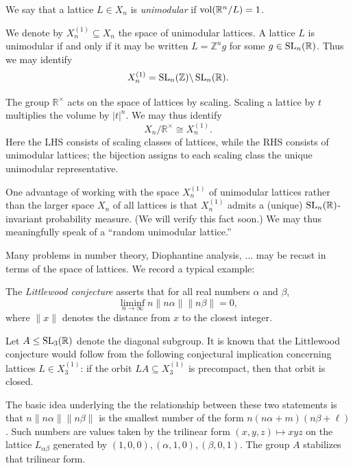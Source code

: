 \documentclass[reqno]{amsart} 
\begin{document}
\begin{definition}
  We say that a lattice $L \in X_n$ is \emph{unimodular} if $\operatorname{vol}(\mathbb{R}^n/L) = 1$.
\end{definition}
We denote by $X_n^{(1)} \subseteq X_n$ the space of unimodular lattices.  A lattice $L$ is unimodular if and only if it may be written $L = \mathbb{Z}^n g$ for some $g \in \operatorname{SL}_n(\mathbb{R})$.  Thus we may identify
\begin{equation*}
  X_n^{(1)} = \operatorname{SL}_n(\mathbb{Z}) \backslash \operatorname{SL}_n(\mathbb{R}).
\end{equation*}

The group $\mathbb{R}^\times$ acts on the space of lattices by scaling.  Scaling a lattice by $t$ multiplies the volume by $|t|^{n}$.  We may thus identify
\begin{equation*}
  X_n / \mathbb{R}^\times \cong X_n^{(1)}.
\end{equation*}
Here the LHS consists of scaling classes of lattices, while the RHS consists of unimodular lattices; the bijection assigns to each scaling class the unique unimodular representative.

One advantage of working with the space $X_n^{(1)}$ of unimodular lattices rather than the larger space $X_n$ of all lattices is that $X_n^{(1)}$ admits a (unique) $\operatorname{SL}_n(\mathbb{R})$-invariant probability measure.  (We will verify this fact soon.) We may thus meaningfully speak of a ``random unimodular lattice.''

Many problems in number theory, Diophantine analysis, $\dotsc$ may be recast in terms of the space of lattices.  We record a typical example:
\begin{example}
  The \emph{Littlewood conjecture} asserts that for all real numbers $\alpha$ and $\beta$,
  \begin{equation*}
    \liminf _{n \rightarrow \infty } n \|n \alpha \| \|n \beta \| = 0,
  \end{equation*}
  where $\|x\|$ denotes the distance from $x$ to the closest integer.

  Let $A \leq \operatorname{SL}_3(\mathbb{R})$ denote the diagonal subgroup.  It is known that the Littlewood conjecture would follow from the following conjectural implication concerning lattices $L \in X_3^{(1)}$: if the orbit $L A \subseteq X_3^{(1)}$ is precompact, then that orbit is closed.

  The basic idea underlying the the relationship between these two statements is that $n \|n \alpha \| \|n \beta \|$ is the smallest number of the form $n (n \alpha + m ) (n \beta + \ell)$.  Such numbers are values taken by the trilinear form $(x,y,z) \mapsto x y z$ on the lattice $L_{\alpha \beta }$ generated by $(1,0,0), (\alpha, 1, 0), (\beta, 0, 1)$.  The group $A$ stabilizes that trilinear form.
\end{example}
\end{document}
